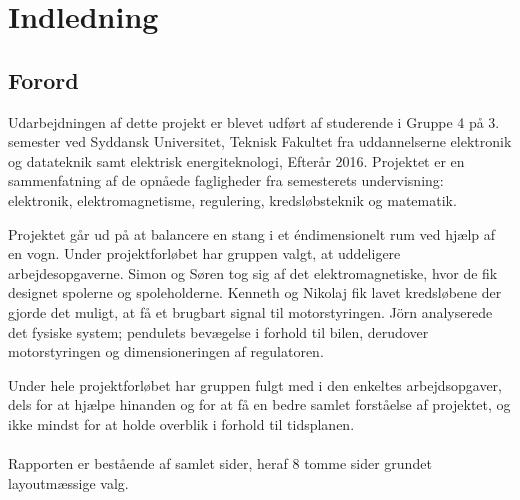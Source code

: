 \chapter{Indledning}

\section{Forord}\label{sec:forord}
Udarbejdningen af dette projekt er blevet udført af studerende i Gruppe 4 på 3. semester ved Syddansk Universitet, Teknisk Fakultet fra uddannelserne elektronik og datateknik samt elektrisk energiteknologi, Efterår 2016.
Projektet er en sammenfatning af de opnåede fagligheder fra semesterets undervisning: elektronik, elektromagnetisme, regulering, kredsløbsteknik og matematik.

Projektet går ud på at balancere en stang i et éndimensionelt rum ved hjælp af en vogn. Under projektforløbet har gruppen valgt, at uddeligere arbejdesopgaverne. Simon og Søren tog sig af det elektromagnetiske, hvor de fik designet spolerne og spoleholderne. Kenneth og Nikolaj fik lavet kredsløbene der gjorde det muligt, at få et brugbart signal til motorstyringen. Jörn analyserede det fysiske system; pendulets bevægelse i forhold til bilen, derudover motorstyringen og dimensioneringen af regulatoren.

Under hele projektforløbet har gruppen fulgt med i den enkeltes arbejdsopgaver, dels for at hjælpe hinanden og for at få en bedre samlet forståelse af projektet, og ikke mindst for at holde overblik i forhold til tidsplanen. 
\\ \\
Rapporten er bestående af samlet \pageref{LastPage} sider, heraf  8 tomme sider grundet layoutmæssige valg. 